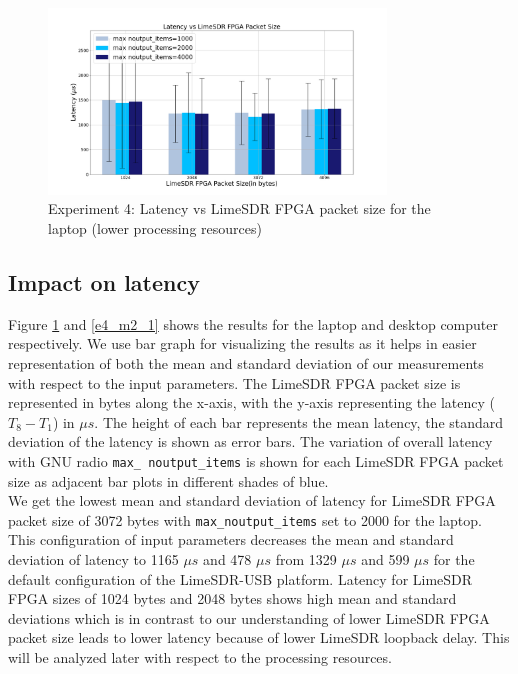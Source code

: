 \begin{figure}[h!]
\centering
\includegraphics[width=0.8\textwidth]{Thesis/Figure/E4_M1_1.png}
\caption{Experiment 4: Latency vs LimeSDR FPGA packet size for the laptop (lower processing resources)}
\label{e4_m1_1}
\end{figure}

\subsection{Impact on latency}
Figure \ref{e4_m1_1} and \ref{e4_m2_1} shows the results for the laptop and desktop computer respectively.
We use bar graph for visualizing the results as it helps in easier representation of both the mean and standard deviation of our measurements with respect to the input parameters.
The LimeSDR FPGA packet size is represented in bytes along the x-axis, with the y-axis representing the latency ($T_8 - T_1$) in $\mu s$.
The height of each bar represents the mean latency, the standard deviation of the latency is shown as  error bars.
The variation of overall latency with GNU radio \texttt{max\_ noutput\_items} is shown for each LimeSDR FPGA packet size as adjacent bar plots in different shades of blue.\\

We get the lowest mean and standard deviation of latency for LimeSDR FPGA packet size of 3072 bytes with \texttt{max\_noutput\_items} set to 2000 for the laptop.
This configuration of input parameters decreases the mean and standard deviation of latency to  1165 $\mu s$ and 478 $\mu s$  from 1329 $\mu s$ and 599 $\mu s$ for the default configuration of the LimeSDR-USB platform.
Latency for LimeSDR FPGA sizes of 1024 bytes and 2048 bytes shows high mean and standard deviations which is in contrast to our understanding of lower LimeSDR FPGA packet size leads to lower latency because of lower LimeSDR loopback delay. This will be analyzed later with respect to the processing resources.\\


